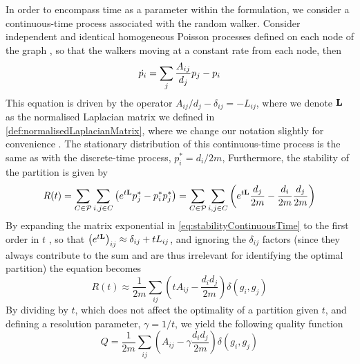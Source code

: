 In order to encompass time as a parameter within the formulation, we consider a continuous-time process associated with the random walker.
Consider independent and identical homogeneous Poisson processes defined on each node of the graph \cite{LDB08}, so that the walkers moving at a constant rate from each node, then
\begin{equation}
	\label{eq:densityRandomWalkerContinuousTime}
	\dot{p_{i}} = \sum_{j} \frac{A_{ij}}{d_{j}} p_{j} - p_{i}
\end{equation}
This equation is driven by the operator $A_{ij}/d_{j} - \delta_{ij} = -L_{ij}$, where we denote $\mathbf L$ as the normalised Laplacian matrix we defined in \cref{def:normalisedLaplacianMatrix}, where we change our notation slightly for convenience \cite{MRM+10}.
The stationary distribution of this continuous-time process is the same as with the discrete-time process, $p_{i}^{*} = d_{i}/2m$,
Furthermore, the stability of the partition is given by
\begin{equation}
	\label{eq:stabilityContinuousTime}
	R(t) = \sum_{C \in \mathcal P} \sum_{i,j \in C} \left( e^{t \mathbf L} p_{j}^{*} - p_{i}^{*} p_{j}^{*} \right) = \sum_{C \in \mathcal P} \sum_{i,j \in C} \left( e^{t \mathbf L} \frac{d_{j}}{2m} - \frac{d_{i}}{2m} \frac{d_{j}}{2m} \right)
\end{equation}
By expanding the matrix exponential in \cref{eq:stabilityContinuousTime} to the first order in $t$ \cite{LDB08}, so that $\left( e^{t \mathbf L} \right)_{ij} \approx \delta_{ij} + tL_{ij}$, and ignoring the $\delta_{ij}$ factors (since they always contribute to the sum and are thus irrelevant for identifying the optimal partition) the equation becomes
\begin{equation}
	\label{eq:stabilityContinuousTimeApproximation}
	R(t) \approx \frac{1}{2m} \sum_{ij} \left( tA_{ij} - \frac{d_{i}d_{j}}{2m} \right) \delta(g_{i},g_{j})
\end{equation}
By dividing by $t$, which does not affect the optimality of a partition given $t$, and defining a resolution parameter, $\gamma = 1/t$, we yield the following quality function
\begin{equation}
	\label{eq:modularityFromStabilityContinuousTimeApproximation}
	Q = \frac{1}{2m} \sum_{ij} \left( A_{ij} - \gamma \frac{d_{i}d_{j}}{2m} \right) \delta(g_{i},g_{j})
\end{equation}


